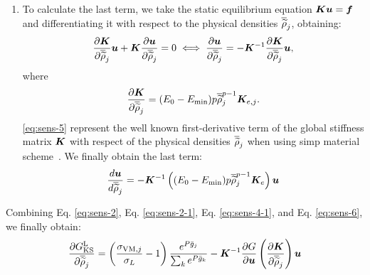 \begin{enumerate}[label=\Alph* --]
    \item To calculate the last term, we take the static equilibrium equation $\bm{K}\bm{u} = \bm{f}$ and differentiating it with respect to the physical densities $\overline{\widetilde{\rho}}_j$, obtaining:
    \begin{equation}
        \frac{\partial\bm{K}}{\partial\overline{\widetilde{\rho}}_j}\bm{u} + \bm{K}\frac{\partial\bm{u}}{\partial\overline{\widetilde{\rho}}_j} = 0 \iff \frac{\partial\bm{u}}{\partial\overline{\widetilde{\rho}}_j} = -\bm{K}^{-1}\frac{\partial\bm{K}}{\partial\overline{\widetilde{\rho}}_j}\bm{u},
    \end{equation}
    where
    \begin{equation}
        \label{eq:sens-5}
        \frac{\partial\bm{K}}{\partial\overline{\widetilde{\rho}}_{j}} = (E_0-E_{\textrm{min}}) p\overline{\widetilde{\rho}}_j^{p-1} \bm{K}_{e,j}.
    \end{equation}
    \eqref{eq:sens-5} represent the well known first-derivative term of the global stiffness matrix $\bm{K}$ with respect of the physical densities $\overline{\widetilde{\rho}}_j$ when using \gls{simp} material scheme~. We finally obtain the last term:
    \begin{equation} \label{eq:sens-6}
        \frac{d \bm{u} }{d \overline{\widetilde{\rho}}_j} = - \bm{K}^{-1} \left((E_0-E_{\textrm{min}}) p\overline{\widetilde{\rho}}_j^{p-1} \bm{K}_e \right) \bm{u}
    \end{equation}
\end{enumerate}

Combining Eq. \ref{eq:sens-2}, Eq. \ref{eq:sens-2-1}, Eq. \ref{eq:sens-4-1}, and Eq. \ref{eq:sens-6}, we finally obtain:
\begin{equation}
\frac{\partial G_{\text{KS}}^\text{L}}{\partial\overline{\widetilde{\rho}}_j} = \left(\frac{ \sigma_{\text{VM},j}}{\sigma_L}-1 \right) \frac{e^{{P}\bar{g}_j}}{\sum_k e^{{P}\bar{g}_k}} - 
\bm{K}^{-1}\frac{\partial G}{\partial\bm{u}} \left(\frac{\partial\bm{K}}{\partial\overline{\widetilde{\rho}}_{j}} \right) \bm{u}
\end{equation}

